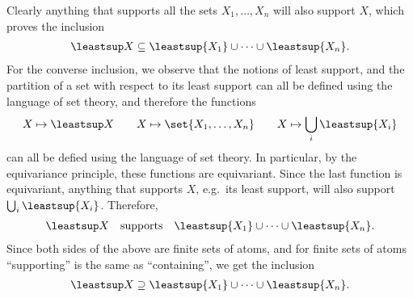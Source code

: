 {Clearly anything that supports all the sets $X_1,\ldots,X_n$ will also support $X$, which proves the inclusion
\begin{align*}
 \leastsup X \subseteq \leastsup{X_1} \cup \cdots \cup \leastsup {X_n}.
 \end{align*}
 For the converse inclusion, we observe that the notions of least support, and the partition of a set with respect to its least support can all be defined using the language of set theory, and therefore the functions
\begin{align*}
 X \mapsto \leastsup X \qquad X \mapsto \set{X_1,\ldots,X_n} \qquad X \mapsto \bigcup_{i} \leastsup {X_i}
\end{align*}
can all be defied using the language of set theory. In particular, by the equivariance principle, these functions are equivariant. Since the last function is equivariant, anything that supports $X$, e.g.~its least support, will also support $\bigcup_i \leastsup{X_i}$. Therefore, 
\begin{align*}
 \leastsup X \quad \text{supports} \quad \leastsup{X_1} \cup \cdots \cup \leastsup {X_n}.
 \end{align*}
Since both sides of the above are finite sets of atoms, and for finite sets of atoms ``supporting'' is the same as ``containing'', we get the inclusion
\begin{align*}
 \leastsup X \supseteq \leastsup{X_1} \cup \cdots \cup \leastsup {X_n}.
 \end{align*}

}


